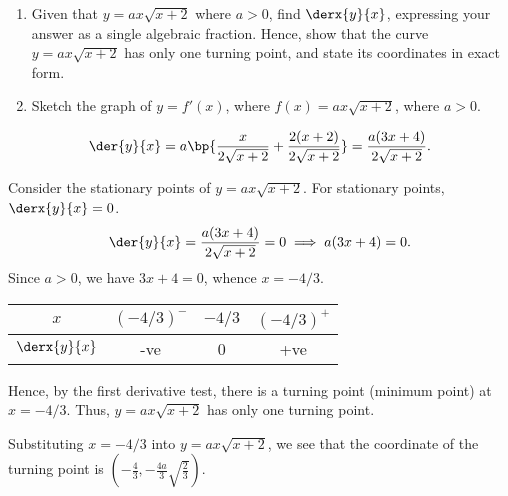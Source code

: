 \begin{problem}
    \begin{enumerate}
        \item Given that $y=ax\sqrt{x+2}$ where $a > 0$, find $\derx{y}{x}$, expressing your answer as a single algebraic fraction. Hence, show that the curve $y = ax\sqrt{x+2}$ has only one turning point, and state its coordinates in exact form.
        \item Sketch the graph of $y = f'(x)$, where $f(x) = ax\sqrt{x+2}$, where $a > 0$.
    \end{enumerate}
\end{problem}
\begin{solution}
    \begin{ppart}
        \[\der{y}{x} = a \bp{\frac{x}{2\sqrt{x+2}} + \frac{2(x+2)}{2\sqrt{x+2}}} = \frac{a(3x+4)}{2\sqrt{x+2}}.\]

        Consider the stationary points of $y=ax\sqrt{x+2}$. For stationary points, $\derx{y}{x} =0$. \[\der{y}{x} = \frac{a(3x+4)}{2\sqrt{x+2}} = 0 \implies a(3x+4) = 0.\] Since $a > 0$, we have $3x+4=0$, whence $x = -4/3$.

        \begin{table}[H]
            \centering
            \begin{tabular}{|c|c|c|c|}
            \hline
            $x$ & $(-4/3)^-$ & $-4/3$ & $(-4/3)^+$ \\\hline
            $\derx{y}{x}$ & -ve & 0 & +ve \\\hline
            \end{tabular}
        \end{table}

        Hence, by the first derivative test, there is a turning point (minimum point) at $x = -4/3$. Thus, $y = ax\sqrt{x+2}$ has only one turning point.

        Substituting $x = -4/3$ into $y = ax\sqrt{x+2}$, we see that the coordinate of the turning point is $(-\frac43, -\frac{4a}3 \sqrt{\frac23})$.
    \end{ppart}
    \clearpage
    \begin{ppart}
        \begin{center}
\end{center}
\end{ppart}
\end{solution}

